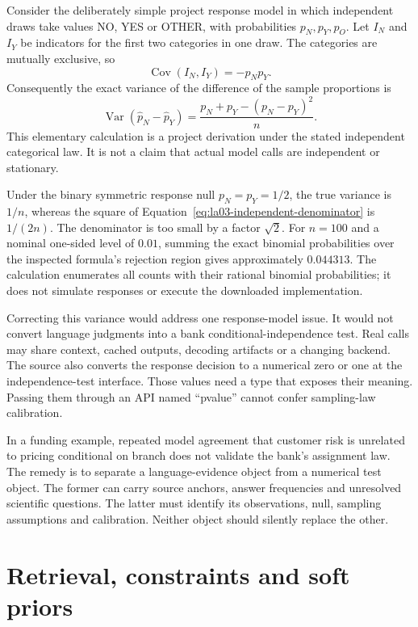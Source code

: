 Consider the deliberately simple project response model in which independent
draws take values NO, YES or OTHER, with probabilities $p_N,p_Y,p_O$. Let
$I_N$ and $I_Y$ be indicators for the first two categories in one draw. The
categories are mutually exclusive, so
\[
 \operatorname{Cov}(I_N,I_Y)=-p_Np_Y.
\]
Consequently the exact variance of the difference of the sample proportions is
\begin{equation}
 \operatorname{Var}(\widehat p_N-\widehat p_Y)
 =\frac{p_N+p_Y-(p_N-p_Y)^2}{n}.
 \label{eq:la03-multinomial-variance}
\end{equation}
This elementary calculation is a project derivation under the stated
independent categorical law. It is not a claim that actual model calls are
independent or stationary.

Under the binary symmetric response null $p_N=p_Y=1/2$, the true variance is
$1/n$, whereas the square of
Equation~\eqref{eq:la03-independent-denominator} is $1/(2n)$. The denominator
is too small by a factor $\sqrt{2}$. For $n=100$ and a nominal one-sided
level of $0.01$, summing the exact binomial probabilities over the inspected
formula's rejection region gives approximately $0.044313$. The calculation
enumerates all counts with their rational binomial probabilities; it does not
simulate responses or execute the downloaded implementation.

Correcting this variance would address one response-model issue. It would not
convert language judgments into a bank conditional-independence test. Real
calls may share context, cached outputs, decoding artifacts or a changing
backend. The source also converts the response decision to a numerical zero
or one at the independence-test interface. Those values need a type that
exposes their meaning. Passing them through an API named ``pvalue'' cannot
confer sampling-law calibration.

In a funding example, repeated model agreement that customer risk is unrelated
to pricing conditional on branch does not validate the bank's assignment law.
The remedy is to separate a language-evidence object from a numerical test
object. The former can carry source anchors, answer frequencies and unresolved
scientific questions. The latter must identify its observations, null,
sampling assumptions and calibration. Neither object should silently replace
the other.

\section{Retrieval, constraints and soft priors}

